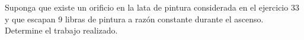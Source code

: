 \item Suponga que existe un orificio en la lata de pintura considerada en el ejercicio 33 y que escapan 9 libras de pintura a razón constante durante el ascenso. Determine el trabajo realizado.
